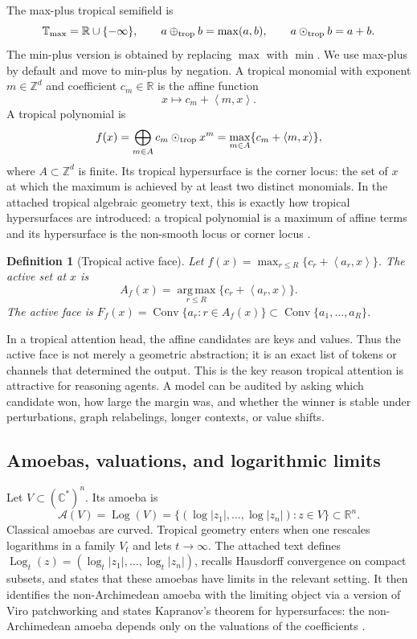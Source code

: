 \documentclass[11pt]{article}
\newtheorem{definition}{Definition}[section]
\newcommand{\R}{\mathbb{R}}
\newcommand{\Z}{\mathbb{Z}}
\newcommand{\T}{\mathbb{T}}
\newcommand{\calA}{\mathcal{A}}
\newcommand{\oplusT}{\oplus_{\rm trop}}
\newcommand{\odotT}{\odot_{\rm trop}}
\newcommand{\argmax}{\operatorname*{arg\,max}}
\newcommand{\Conv}{\operatorname{Conv}}
\newcommand{\Log}{\operatorname{Log}}
\newcommand{\ip}[2]{\left\langle #1,#2\right\rangle}
\begin{document}
The max-plus tropical semifield is
\begin{equation}
\T_{\max}=\R\cup\{-\infty\},\qquad a\oplusT b=\max(a,b),\qquad a\odotT b=a+b.
\end{equation}
The min-plus version is obtained by replacing \(\max\) with \(\min\).  We use max-plus by default and move to min-plus by negation.  A tropical monomial with exponent \(m\in\Z^d\) and coefficient \(c_m\in\R\) is the affine function
\begin{equation}
x\longmapsto c_m+\ip{m}{x}.
\end{equation}
A tropical polynomial is
\begin{equation}
f(x)=\bigoplus_{m\in A} c_m\odotT x^m=\max_{m\in A}\{c_m+\ip{m}{x}\},
\end{equation}
where \(A\subset\Z^d\) is finite.  Its tropical hypersurface is the corner locus: the set of \(x\) at which the maximum is achieved by at least two distinct monomials.  In the attached tropical algebraic geometry text, this is exactly how tropical hypersurfaces are introduced: a tropical polynomial is a maximum of affine terms and its hypersurface is the non-smooth locus or corner locus \cite{itenberg2009}.

\begin{definition}[Tropical active face]
Let \(f(x)=\max_{r\le R}\{c_r+\ip{a_r}{x}\}\).  The active set at \(x\) is
\begin{equation}
A_f(x)=\argmax_{r\le R}\{c_r+\ip{a_r}{x}\}.
\end{equation}
The active face is \(F_f(x)=\Conv\{a_r:r\in A_f(x)\}\subset\Conv\{a_1,\ldots,a_R\}\).
\end{definition}

In a tropical attention head, the affine candidates are keys and values.  Thus the active face is not merely a geometric abstraction; it is an exact list of tokens or channels that determined the output.  This is the key reason tropical attention is attractive for reasoning agents.  A model can be audited by asking which candidate won, how large the margin was, and whether the winner is stable under perturbations, graph relabelings, longer contexts, or value shifts.

\subsection{Amoebas, valuations, and logarithmic limits}

Let \(V\subset(\mathbb C^*)^n\).  Its amoeba is
\begin{equation}
\calA(V)=\Log(V)=\{(\log|z_1|,\ldots,\log|z_n|):z\in V\}\subset\R^n.
\end{equation}
Classical amoebas are curved.  Tropical geometry enters when one rescales logarithms in a family \(V_t\) and lets \(t\to\infty\).  The attached text defines \(\Log_t(z)=(\log_t|z_1|,\ldots,\log_t|z_n|)\), recalls Hausdorff convergence on compact subsets, and states that these amoebas have limits in the relevant setting.  It then identifies the non-Archimedean amoeba with the limiting object via a version of Viro patchworking and states Kapranov's theorem for hypersurfaces: the non-Archimedean amoeba depends only on the valuations of the coefficients \cite{itenberg2009}.
\end{document}
